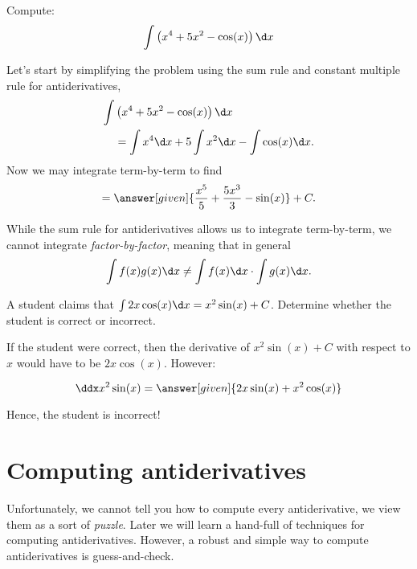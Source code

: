 \documentclass{ximera}
\begin{document}
\begin{example}
Compute:
\[
\int \left(x^4 + 5x^2 - \cos(x)\right) \d x
\]
\begin{explanation}
Let's start by simplifying the problem using the sum rule 
 and constant multiple rule for antiderivatives, 
\begin{align*}
\int &\left(x^4 + 5x^2 - \cos(x)\right) \d x\\
&= \int x^4 \d x + 5\int x^2 \d x - \int \cos(x) \d x.
\end{align*}
Now we may integrate term-by-term to find
\[
= \answer[given]{\frac{x^5}{5} + \frac{5x^3}{3}  - \sin(x)}+C.
\]
\end{explanation}
\end{example}


\begin{warning}
While the sum rule for antiderivatives allows us to integrate
term-by-term, we cannot integrate \textit{factor-by-factor}, meaning
that in general
\[
\int f(x)g(x) \d x \ne \int f(x) \d x\cdot \int g(x) \d x.
\]
\end{warning}


\begin{example}
  A student claims that $\int 2x \cos(x) \d x = x^2 \sin(x) +C$.  Determine whether the student is correct or incorrect.
  
  \begin{explanation}
    If the student were correct, then the derivative of $x^2 \sin(x) +C$ with respect to $x$ would have to be $2x \cos(x)$.  However:
    
      \[\ddx x^2 \sin(x) = \answer[given]{2x \sin(x) +x^2 \cos(x)} \]
      
 Hence, the student is incorrect!
  \end{explanation}
\end{example}






\section{Computing antiderivatives}


Unfortunately, we cannot tell you how to compute every antiderivative,
we view them as a sort of \textit{puzzle}. Later we will learn a
hand-full of techniques for computing antiderivatives. However, a
robust and simple way to compute antiderivatives is guess-and-check.


\end{document}

